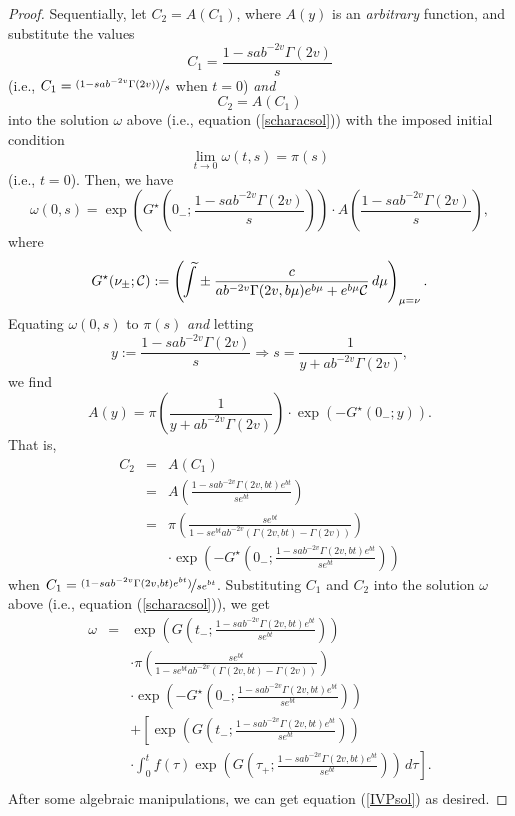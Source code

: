 \documentclass[preprint, 12pt]{elsarticle}
\numberwithin{equation}{section}
\theoremstyle{plain}
\theoremstyle{remark}
\newcommand{\assign}{:=}
\newcommand{\nocomma}{}
\begin{document}
\begin{proof}
Sequentially, let $C_2 = A (C_1)$, where $A (y)$ is an {\emph{arbitrary}} function, and substitute the values 
\[\displaystyle{C_1 = \frac{1 - s a b^{- 2 v} \Gamma (2 v \nocomma)}{s}}\] 
(i.e., $\displaystyle{C_1 = \nicefrac{(1 - s a b^{- 2 v} \Gamma (2 v \nocomma))}{s}}$ when $t = 0$) \emph{and} 
\[C_2 = A (C_1)\]
into the solution $\omega$ above (i.e., equation (\ref{scharacsol})) with the imposed initial condition
\[ \lim_{t \rightarrow 0} \omega (t, s) = \pi (s) \]
(i.e., $t = 0$). Then, we have
\[ \omega (0, s) = \exp \left( G^{\star} \left( 0_- ; \frac{1 - s a b^{- 2 v} \Gamma (2 v \nocomma)}{s} \right) \right) \cdot A \left( \frac{1 - s a b^{- 2 v} \Gamma (2 v \nocomma)}{s} \right), \]
where
\[ G^{\star} (\nu_{\pm} ; \mathcal{C}) \assign \left( \kern6pt \widetilde{\kern-7pt\int} \pm \frac{c}{a b^{- 2 v} \Gamma (2 v \nocomma, b \mu) e^{b \mu} +e^{b\mu} \mathcal{C}}\, d \mu \right)_{\mu = \nu} . \]
Equating $\omega (0, s)$ to $\pi (s)$ \emph{and} letting 
\[\displaystyle{y \assign \frac{1 - s a b^{- 2 v} \Gamma (2 v \nocomma)}{s} \Longrightarrow s = \frac{1}{y + a b^{- 2 v} \Gamma (2 v \nocomma)}},\] 
we find
\[ A (y) = \pi \left( \frac{1}{y + a b^{- 2 v} \Gamma (2 v \nocomma)} \right) \cdot \exp \left( - G^{\star} \left( 0_- ; y \right) \right) . \]
That is,
\begin{eqnarray*}
C_2 & = & A (C_1)\\
& = & A \left( \frac{1 - s a b^{- 2 v} \Gamma (2 v \nocomma, b t) e^{b t}}{s e^{bt}} \right)\\
& = & \pi \left( \frac{s e^{bt}}{1 - s e^{b t} a b^{- 2 v}  (\Gamma (2 v \nocomma, b t) - \Gamma (2 v \nocomma))} \right)\\ 
& & \cdot \exp \left( - G^{\star} \left( 0_- ; \frac{1 - s a b^{- 2 v} \Gamma (2 v \nocomma, b t) e^{b t}}{s e^{bt}} \right) \right)
\end{eqnarray*}
when $\displaystyle{C_1 = \nicefrac{(1 - s a b^{- 2 v} \Gamma (2 v \nocomma, b t) e^{b t})}{s e^{bt}}}$. Substituting $C_1$ and $C_2$ into the solution $\omega$ above (i.e., equation (\ref{scharacsol})), we get
\begin{eqnarray*}
\omega & = & \exp \left( G \left( t_- ; \frac{1 - s a b^{- 2 v} \Gamma (2 v \nocomma, b t) e^{b t}}{s e^{bt}} \right) \right)\\
&  & \cdot \pi \left( \frac{s e^{bt}}{1 - s e^{bt} a b^{- 2 v}  (\Gamma (2 v \nocomma, b t) - \Gamma (2 v \nocomma))} \right)\\ 
& & \cdot \exp \left( - G^{\star} \left( 0_- ; \frac{1 - s a b^{- 2 v} \Gamma (2 v \nocomma, b t) e^{b t}}{s e^{bt}} \right) \right)\\
&  & + \left[\exp \left( G \left( t_- ; \frac{1 - s a b^{- 2 v} \Gamma (2 v \nocomma, b t) e^{b t}}{s e^{bt}} \right) \right)\right.\\ 
& & \left.\cdot \int_0^t f (\tau) \exp \left( G \left( \tau_+ ; \frac{1 - s a b^{- 2 v} \Gamma (2 v \nocomma, b t) e^{b t}}{s e^{bt}} \right) \right)\, d \tau\right]. \\
  \end{eqnarray*}
After some algebraic manipulations, we can get equation (\ref{IVPsol}) as desired.
\end{proof}
\end{document}
